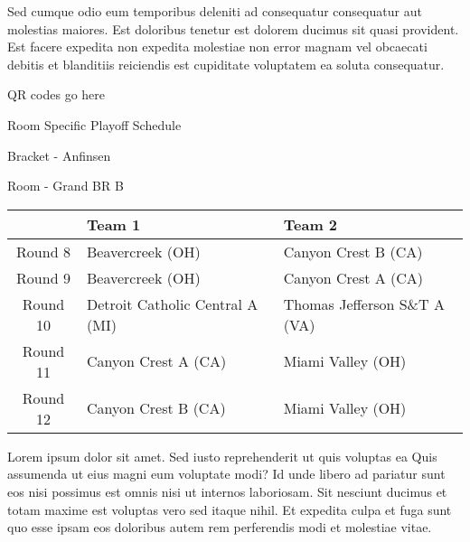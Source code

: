 \documentclass{article}%
\begin{document}
\newline%
Sed cumque odio eum temporibus deleniti ad consequatur consequatur aut molestias maiores. Est doloribus tenetur est dolorem ducimus sit quasi provident. Est facere expedita non expedita molestiae non error magnam vel obcaecati debitis et blanditiis reiciendis est cupiditate voluptatem ea soluta consequatur.%
\vspace*{140pt}%
\begin{center}%
\begin{Huge}%
QR codes go here%
\end{Huge}%
\end{center}%
\newpage%
\begin{center}%
\begin{Huge}%
Room Specific Playoff Schedule%
\end{Huge}%
\vspace*{8pt}%
\linebreak%
\begin{Large}%
Bracket {-} Anfinsen%
\end{Large}%
\vspace*{8pt}%
\linebreak%
\vspace*{8pt}%
\begin{Large}%
Room {-} Grand BR B%
\end{Large}%
\end{center}%
%
\begin{tabularx}{\textwidth}{|c|Y|Y|}%
\hline%
&Team 1&Team 2\\%
\hline%
Round 8&Beavercreek (OH)&Canyon Crest B (CA)\\%
Round 9&Beavercreek (OH)&Canyon Crest A (CA)\\%
Round 10&Detroit Catholic Central A (MI)&Thomas Jefferson S\&T A (VA)\\%
Round 11&Canyon Crest A (CA)&Miami Valley (OH)\\%
Round 12&Canyon Crest B (CA)&Miami Valley (OH)\\%
\hline%
\end{tabularx}%
\vspace*{8pt}%
\newline%
Lorem ipsum dolor sit amet. Sed iusto reprehenderit ut quis voluptas ea Quis assumenda ut eius magni eum voluptate modi? Id unde libero ad pariatur sunt eos nisi possimus est omnis nisi ut internos laboriosam. Sit nesciunt ducimus et totam maxime est voluptas vero sed itaque nihil. Et expedita culpa et fuga sunt quo esse ipsam eos doloribus autem rem perferendis modi et molestiae vitae.\newline%
\end{document}
